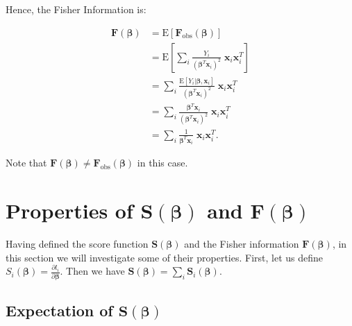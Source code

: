 \documentclass[
  12pt,
]{book}
\begin{document}
Hence, the Fisher Information is:

\begin{align}
  \boldsymbol{F}(\boldsymbol{\beta})
  & = {\mathrm E}[\boldsymbol{F}_{\text{obs}}(\boldsymbol{\beta})] \\
  & = \textrm{E} \left[ \sum_{i} \frac{Y_{i}}{(\boldsymbol{\beta}^{T}\boldsymbol{x}_{i})^{2}} \;\boldsymbol{x}_{i}\boldsymbol{x}_{i}^{T} \right] \\
  & = \sum_{i} \frac{{\mathrm E}[Y_{i} |\boldsymbol{\beta}, \boldsymbol{x}_{i}]}{ (\boldsymbol{\beta}^{T}\boldsymbol{x}_{i})^{2}} \;\boldsymbol{x}_{i}\boldsymbol{x}_{i}^{T} \\
  & = \sum_{i} \frac{\boldsymbol{\beta}^{T}\boldsymbol{x}_{i} }{ (\boldsymbol{\beta}^{T}\boldsymbol{x}_{i})^{2}} \;\boldsymbol{x}_{i}\boldsymbol{x}_{i}^{T} \\
  & = \sum_{i} \frac{1 }{ \boldsymbol{\beta}^{T}\boldsymbol{x}_{i}}\;\boldsymbol{x}_{i}\boldsymbol{x}_{i}^{T}.
\end{align}

Note that \(\boldsymbol{F}(\boldsymbol{\beta}) \neq \boldsymbol{F}_{\text{obs}}(\boldsymbol{\beta})\) in this case.

\section{\texorpdfstring{Properties of \(\boldsymbol{S}(\boldsymbol{\beta})\) and \(\boldsymbol{F}(\boldsymbol{\beta})\)}{Properties of \textbackslash boldsymbol\{S\}(\textbackslash boldsymbol\{\textbackslash beta\}) and \textbackslash boldsymbol\{F\}(\textbackslash boldsymbol\{\textbackslash beta\})}}\label{properties}

Having defined the score function \(\boldsymbol{S}(\boldsymbol{\beta})\) and the Fisher information \(\boldsymbol{F}(\boldsymbol{\beta})\), in this section we will investigate some of their properties.
First, let us define \(\displaystyle S_i(\boldsymbol{\beta}) = \frac{\partial l_i}{\partial \boldsymbol{\beta}}\). Then we have \(\boldsymbol{S}(\boldsymbol{\beta}) = \sum_{i} \boldsymbol{S}_{i}(\boldsymbol{\beta})\).

\subsection{\texorpdfstring{Expectation of \(\boldsymbol{S}(\boldsymbol{\beta})\)}{Expectation of \textbackslash boldsymbol\{S\}(\textbackslash boldsymbol\{\textbackslash beta\})}}\label{expectation-of-boldsymbolsboldsymbolbeta}
\end{document}

